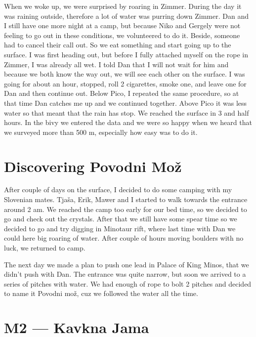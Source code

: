 When we woke up, we were surprised by roaring in Zimmer. During the day
it was raining outside, therefore a lot of water was purring down
Zimmer. Dan and I still have one more night at a camp, but because Niko
and Gergely were not feeling to go out in these conditions, we
volunteered to do it. Beside, someone had to cancel their call out. So
we eat something and start going up to the surface. I was first heading
out, but before I fully attached myself on the rope in Zimmer, I was
already all wet. I told Dan that I will not wait for him and because we
both know the way out, we will see each other on the surface. I was
going for about an hour, stopped, roll 2 cigarettes, smoke one, and
leave one for Dan and then continue out. Below Pico, I repeated the same
procedure, so at that time Dan catches me up and we continued together.
Above Pico it was less water so that meant that the rain has stop. We
reached the surface in 3 and half hours. In the bivy we entered the data
and we were so happy when we heard that we surveyed more than 500 m,
especially how easy was to do it.


\section{Discovering Povodni Mož}\label{discovering-povodni-moux17e}

After couple of days on the surface, I decided to do some camping with
my Slovenian mates. Tjaša, Erik, Mawer and I started to walk towards the
entrance around 2 am. We reached the camp too early for our bed time, so
we decided to go and check out the crystals. After that we still have
some spear time so we decided to go and try digging in Minotaur rift,
where last time with Dan we could here big roaring of water. After
couple of hours moving boulders with no luck, we returned to camp.

The next day we made a plan to push one lead in Palace of King Minos,
that we didn't push with Dan. The entrance was quite narrow, but soon we
arrived to a series of pitches with water. We had enough of rope to bolt
2 pitches and decided to name it Povodni mož, cuz we followed the water
all the time.


\section{M2 --- Kavkna Jama}\label{m2-kavkna-jama}

